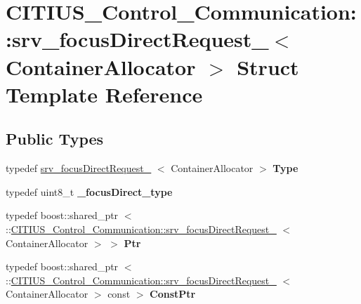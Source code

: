 \hypertarget{struct_c_i_t_i_u_s___control___communication_1_1srv__focus_direct_request__}{\section{\-C\-I\-T\-I\-U\-S\-\_\-\-Control\-\_\-\-Communication\-:\-:srv\-\_\-focus\-Direct\-Request\-\_\-$<$ \-Container\-Allocator $>$ \-Struct \-Template \-Reference}
\label{struct_c_i_t_i_u_s___control___communication_1_1srv__focus_direct_request__}
}
\subsection*{\-Public \-Types}
\begin{DoxyCompactItemize}
\item 
\hypertarget{struct_c_i_t_i_u_s___control___communication_1_1srv__focus_direct_request___a718384eed73a741174bda9d68946209f}{typedef \*
\hyperlink{struct_c_i_t_i_u_s___control___communication_1_1srv__focus_direct_request__}{srv\-\_\-focus\-Direct\-Request\-\_\-}\*
$<$ \-Container\-Allocator $>$ {\bfseries \-Type}}\label{struct_c_i_t_i_u_s___control___communication_1_1srv__focus_direct_request___a718384eed73a741174bda9d68946209f}

\item 
\hypertarget{struct_c_i_t_i_u_s___control___communication_1_1srv__focus_direct_request___a96e97e0f52f46ab52ccfc0c95a751819}{typedef uint8\-\_\-t {\bfseries \-\_\-focus\-Direct\-\_\-type}}\label{struct_c_i_t_i_u_s___control___communication_1_1srv__focus_direct_request___a96e97e0f52f46ab52ccfc0c95a751819}

\item 
\hypertarget{struct_c_i_t_i_u_s___control___communication_1_1srv__focus_direct_request___ae6fee4249ed3133d0f66b566c6701b93}{typedef boost\-::shared\-\_\-ptr\*
$<$ \-::\hyperlink{struct_c_i_t_i_u_s___control___communication_1_1srv__focus_direct_request__}{\-C\-I\-T\-I\-U\-S\-\_\-\-Control\-\_\-\-Communication\-::srv\-\_\-focus\-Direct\-Request\-\_\-}\*
$<$ \-Container\-Allocator $>$ $>$ {\bfseries \-Ptr}}\label{struct_c_i_t_i_u_s___control___communication_1_1srv__focus_direct_request___ae6fee4249ed3133d0f66b566c6701b93}

\item 
\hypertarget{struct_c_i_t_i_u_s___control___communication_1_1srv__focus_direct_request___ab495271e1a5cf8f279f7c3fbd1f7ac42}{typedef boost\-::shared\-\_\-ptr\*
$<$ \-::\hyperlink{struct_c_i_t_i_u_s___control___communication_1_1srv__focus_direct_request__}{\-C\-I\-T\-I\-U\-S\-\_\-\-Control\-\_\-\-Communication\-::srv\-\_\-focus\-Direct\-Request\-\_\-}\*
$<$ \-Container\-Allocator $>$ const  $>$ {\bfseries \-Const\-Ptr}}\label{struct_c_i_t_i_u_s___control___communication_1_1srv__focus_direct_request___ab495271e1a5cf8f279f7c3fbd1f7ac42}

\end{DoxyCompactItemize}
